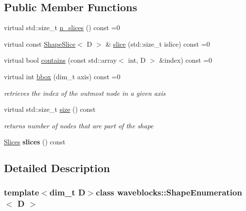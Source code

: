 \subsection*{Public Member Functions}
\begin{DoxyCompactItemize}
\item 
virtual std\+::size\+\_\+t \hyperlink{classwaveblocks_1_1_shape_enumeration_a6400c5e4f36b8077b253a18e91d07fb4}{n\+\_\+slices} () const =0
\item 
virtual const \hyperlink{classwaveblocks_1_1_shape_slice}{Shape\+Slice}$<$ D $>$ \& \hyperlink{classwaveblocks_1_1_shape_enumeration_abb6ab9207b189e4e7b5e67345c4f2ea9}{slice} (std\+::size\+\_\+t islice) const =0
\item 
virtual bool \hyperlink{classwaveblocks_1_1_shape_enumeration_af34f5d866923c3f4efc16dec49b4748d}{contains} (const std\+::array$<$ int, D $>$ \&index) const =0
\item 
virtual int \hyperlink{classwaveblocks_1_1_shape_enumeration_a35eb99f86fca58c2983cf8b00432e8c2}{bbox} (dim\+\_\+t axis) const =0
\begin{DoxyCompactList}\small\item\em retrieves the index of the outmost node in a given axis \end{DoxyCompactList}\item 
virtual std\+::size\+\_\+t \hyperlink{classwaveblocks_1_1_shape_enumeration_aa40d5659e3c109d8c77144208a9e1c2c}{size} () const 
\begin{DoxyCompactList}\small\item\em returns number of nodes that are part of the shape \end{DoxyCompactList}\item 
\hypertarget{classwaveblocks_1_1_shape_enumeration_a9b0fb82080a673dc1930d01844172cc0}{}\hyperlink{structwaveblocks_1_1_shape_enumeration_1_1_slices}{Slices} {\bfseries slices} () const \label{classwaveblocks_1_1_shape_enumeration_a9b0fb82080a673dc1930d01844172cc0}

\end{DoxyCompactItemize}


\subsection{Detailed Description}
\subsubsection*{template$<$dim\+\_\+t D$>$class waveblocks\+::\+Shape\+Enumeration$<$ D $>$}

